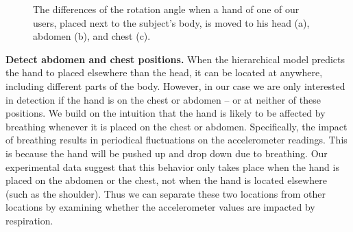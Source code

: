 \begin{figure}[!t]
	\centering
	\caption{The differences of the rotation angle when a hand of one of our users, placed next to the subject's body, is moved to his head (a), abdomen (b), and chest (c). }\label{Bodyhand}
\end{figure}



\textbf{Detect abdomen and chest positions.} {When the hierarchical model predicts the hand to placed elsewhere than the head, it can be located at anywhere, including different parts of the body. {However, in our case we are only interested in detection if the hand is on the chest or abdomen -- or at neither of these positions.} We build on the intuition that the hand is likely to be affected by breathing whenever it is placed on the chest or abdomen.} Specifically, the impact of breathing results in periodical fluctuations on the accelerometer readings. This is because the hand will be pushed up and drop down due to breathing.  {Our experimental data suggest that this behavior only takes place when the hand is placed on the abdomen or the chest, not when the hand is located elsewhere (such as the shoulder). Thus we can separate these two locations from other locations by examining whether the accelerometer values are impacted by respiration.}

